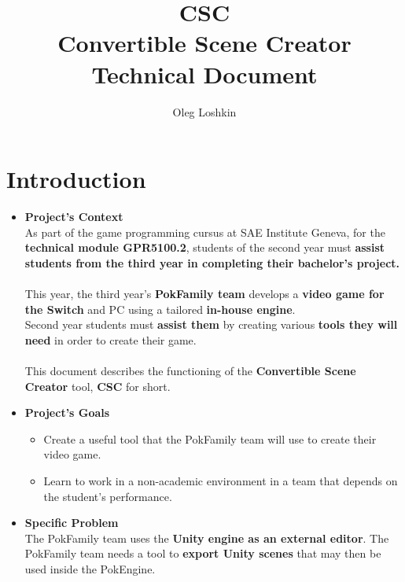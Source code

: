 \documentclass[12pt,a4paper]{article}
\author{Oleg Loshkin}
\title{\textbf{CSC}\\Convertible Scene Creator\\\textbf{Technical Document}}
\begin{document}
\maketitle
\section{Introduction}
	\begin{itemize}
		\item \textbf{Project's Context}
		\\As part of the game programming cursus at SAE Institute Geneva, for the \textbf{technical module GPR5100.2}, students of the second year must \textbf{assist students from the third year in completing their bachelor’s project.}\\\\
		This year, the third year's \textbf{PokFamily team} develops a \textbf{video game for the Switch} and PC using a tailored \textbf{in-house engine}.\\Second year students must \textbf{assist them} by creating various \textbf{tools they will need} in order to create their game.\\\\
		This document describes the functioning of the \textbf{Convertible Scene Creator} tool, \textbf{CSC} for short.
		
		\item \textbf{Project's Goals}
			\begin{itemize}
				\item Create a useful tool that the PokFamily team will use to create their video game.
				
				\item Learn to work in a non-academic environment in a team that depends on the student’s performance.
				
			\end{itemize}
			
		\item \textbf{Specific Problem}
		\\The PokFamily team uses the \textbf{Unity engine as an external editor}. The PokFamily team needs a tool to \textbf{export Unity scenes} that may then be used inside the PokEngine.
	\end{itemize}
\newpage
\end{document}
